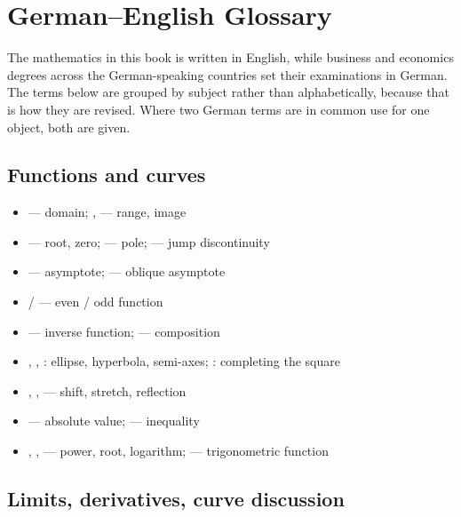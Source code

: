\chapter*{German--English Glossary}

The mathematics in this book is written in English, while business and
economics degrees across the German-speaking countries set their
examinations in German. The terms below are grouped by subject
rather than alphabetically, because that is how they are revised. Where two
German terms are in common use for one object, both are given.

\section*{Functions and curves}

\begin{itemize}[leftmargin=1.4em,itemsep=0.15ex]
  \item {} --- domain; ,
         --- range, image
  \item {} --- root, zero;  --- pole;
         --- jump discontinuity
  \item {} --- asymptote;  --- oblique
        asymptote
  \item {} /  --- even / odd function
  \item {} --- inverse function;  ---
        composition
  \item {}, , : ellipse,
        hyperbola, semi-axes; : completing
        the square
  \item {}, ,  --- shift,
        stretch, reflection
  \item {} --- absolute value;  --- inequality
  \item {}, ,  --- power, root,
        logarithm;  --- trigonometric function
\end{itemize}

\section*{Limits, derivatives, curve discussion}


